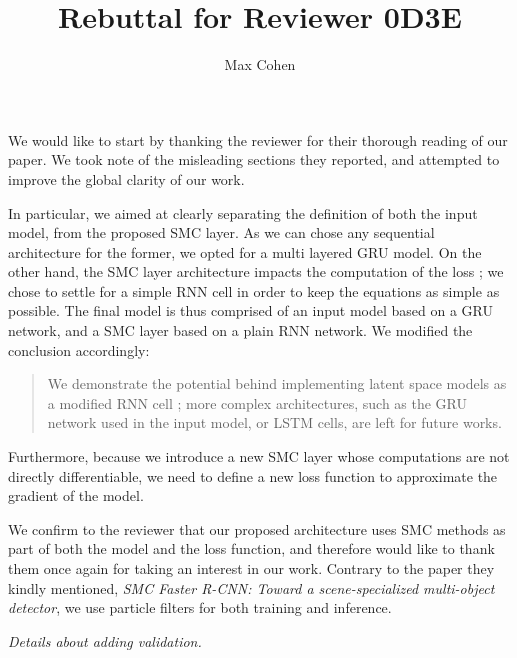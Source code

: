 \documentclass{article}
\title{Rebuttal for Reviewer 0D3E}
\author{Max Cohen}
\affil{Samovar, T\'el\'ecom SudParis, CITI, TIPIC, Institut Polyechnique de Paris}
\date{}
\begin{document}
\maketitle

We would like to start by thanking the reviewer for their thorough reading of our paper.
We took note of the misleading sections they reported, and attempted to improve the global clarity of our work.

In particular, we aimed at clearly separating the definition of both the input model, from the proposed SMC layer.
As we can chose any sequential architecture for the former, we opted for a multi layered GRU model.
On the other hand, the SMC layer architecture impacts the computation of the loss ; we chose to settle for a simple RNN cell in order to keep the equations as simple as possible.
The final model is thus comprised of an input model based on a GRU network, and a SMC layer based on a plain RNN network.
We modified the conclusion accordingly:
\begin{quote}
We demonstrate the potential behind implementing latent space models as a modified RNN cell ;
more complex architectures, such as the GRU network used in the input model, or LSTM cells, are left for future works.
\end{quote}

Furthermore, because we introduce a new SMC layer whose computations are not directly differentiable, we need to define a new loss function to approximate the gradient of the model.

We confirm to the reviewer that our proposed architecture uses SMC methods as part of both the model and the loss function, and therefore would like to thank them once again for taking an interest in our work.
Contrary to the paper they kindly mentioned, \textit{SMC Faster R-CNN: Toward a scene-specialized multi-object detector}, we use particle filters for both training and inference.

\textit{Details about adding validation.}



\end{document}
